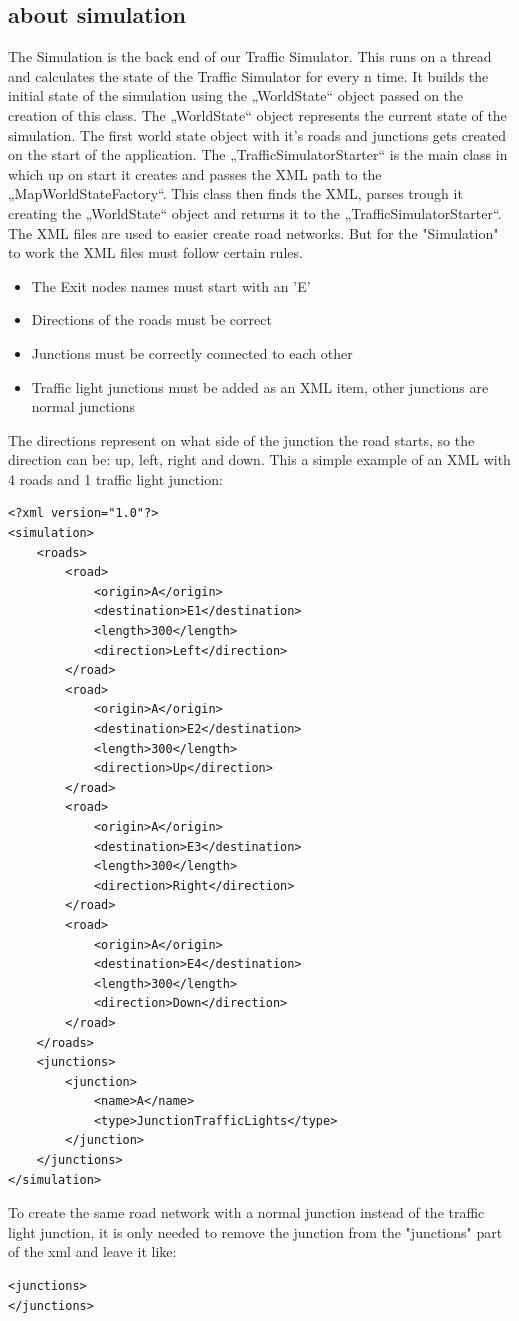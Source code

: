 \documentclass[a4paper,12pt]{article}
\begin{document}
\subsection{about simulation}
The Simulation is the back end of our Traffic Simulator. This runs on a thread and calculates the state of the Traffic Simulator for every n time. It builds the initial state of the simulation using the „WorldState“ object passed on the creation of this class.
\newline
The „WorldState“ object represents the current state of the simulation. The first world state object with it's roads and junctions gets created on the start of the application. The „TrafficSimulatorStarter“ is the main class in which up on start it creates and passes the XML path to the „MapWorldStateFactory“.
This class then finds the XML, parses trough it creating the „WorldState“ object and returns it to the „TrafficSimulatorStarter“.
\newline
The XML files are used to easier create road networks. But for the "Simulation" to work the XML files must follow certain rules.
\begin{itemize}
	\item The Exit nodes names must start with an 'E'
	\item Directions of the roads must be correct
	\item Junctions must be correctly connected to each other
	\item Traffic light junctions must be added as an XML item, other junctions are normal junctions
\end{itemize}
The directions represent on what side of the junction the road starts, so the direction can be: up, left, right and down.
This a simple example of an XML with 4 roads and 1 traffic light junction:
\begin{lstlisting}
<?xml version="1.0"?>
<simulation>
	<roads>
		<road>
			<origin>A</origin>
			<destination>E1</destination>
			<length>300</length>
			<direction>Left</direction>
		</road>
		<road>
			<origin>A</origin>
			<destination>E2</destination>
			<length>300</length>
			<direction>Up</direction>
		</road>
		<road>
			<origin>A</origin>
			<destination>E3</destination>
			<length>300</length>
			<direction>Right</direction>
		</road>
		<road>
			<origin>A</origin>
			<destination>E4</destination>
			<length>300</length>
			<direction>Down</direction>
		</road>
	</roads>
	<junctions>
		<junction>
			<name>A</name>
			<type>JunctionTrafficLights</type>
		</junction>
	</junctions>
</simulation>
\end{lstlisting}
To create the same road network with a normal junction instead of the traffic light junction, it is only needed to remove the junction from the "junctions" part of the xml and leave it like:
\begin{lstlisting}
<junctions>
</junctions>
\end{lstlisting}
\end{document}
